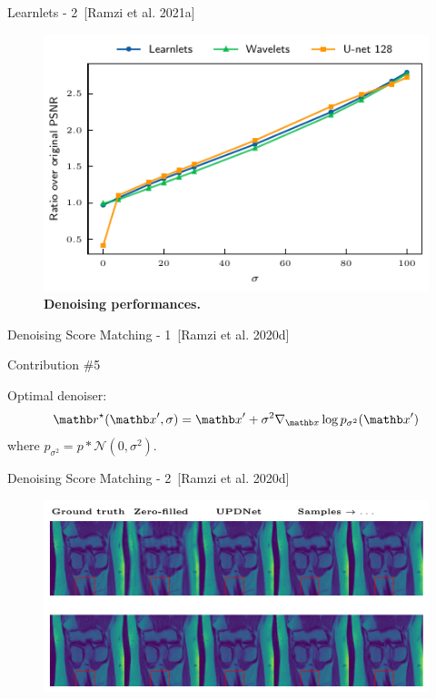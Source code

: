 \begin{frame}{Learnlets - 2~[Ramzi et al. 2021a]}
    \begin{figure}[ht]
        \includegraphics[height=0.78\textheight]{Figures/clinic_applic/model_comparison.pdf}
        \caption{\textbf{Denoising performances.}}
        \end{figure}

\end{frame}

\begin{frame}{Denoising Score Matching - 1~[Ramzi et al. 2020d]}
    \begin{exampleblock}{Contribution \#5}
    \end{exampleblock}
    Optimal denoiser:
    \begin{equation*}
        \rb^\star(\xb', \sigma) = \xb' + \sigma^2 \nabla_{\xb} \log p_{\sigma^2}(\xb')
    \end{equation*}
    where $p_{\sigma^2} = p \ast \mathcal{N}(0, \sigma^2)$.
\end{frame}

\begin{frame}{Denoising Score Matching - 2~[Ramzi et al. 2020d]}
    \begin{figure}
        \centering
        \includegraphics[width=\textwidth]{Figures/clinic_applic/dsm_main.pdf}
    \end{figure}

\end{frame}
